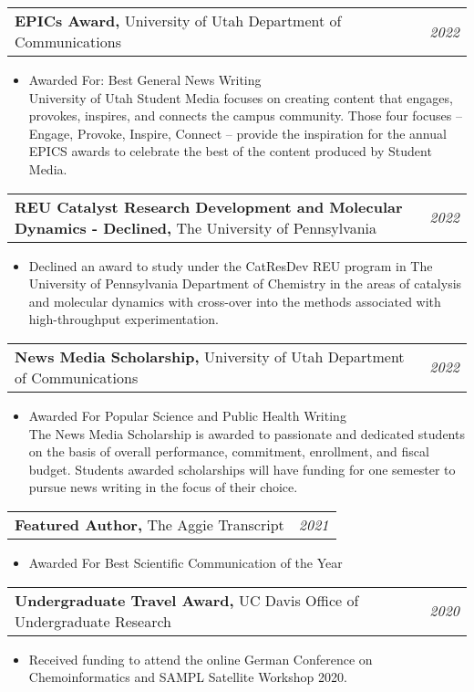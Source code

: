 \documentclass[a4paper,11pt]{article}
\makeatletter
\newcommand{\resumePOR}[3]{
\vspace{0.5mm}\item
    \begin{tabular*}{0.97\textwidth}[t]{l@{\extracolsep{\fill}}r}
        \textbf{#1}\hspace{0.3mm}#2 & \textit{\small{#3}} 
    \end{tabular*}
    \vspace{-2mm}
}
\newcommand{\resumeItemListStart}{\begin{justify}\begin{itemize}[leftmargin=3ex, rightmargin=2ex, noitemsep,labelsep=1.2mm,itemsep=0mm]\small}
\newcommand{\resumeItemListEnd}{\end{itemize}\end{justify}\vspace{-2mm}}
\makeatother
\begin{document}
    \resumePOR{EPICs Award, } %
    {University of Utah Department of Communications } %
    {2022} %
        \resumeItemListStart
    \item {Awarded For: Best General News Writing \cite{homeless} \\
    \setlength\parindent{24pt} University of Utah Student Media focuses on creating content that engages, provokes, inspires, and connects the campus community. Those four focuses – Engage, Provoke, Inspire, Connect – provide the inspiration for the annual EPICS awards to celebrate the best of the content produced by Student Media.}
    \resumeItemListEnd
    
    \resumePOR{REU Catalyst Research Development and Molecular Dynamics - Declined, } %
    {The University of Pennsylvania} %
    {2022} %
        \resumeItemListStart
    \item {Declined an award to study under the CatResDev REU program in The University of Pennsylvania Department of Chemistry in the areas of catalysis and molecular dynamics with cross-over into the methods associated with high-throughput experimentation.}
    \resumeItemListEnd
    
    \resumePOR{News Media Scholarship, } %
    {University of Utah Department of Communications } %
    {2022} %
        \resumeItemListStart
    \item {Awarded For Popular Science and Public Health Writing \\
    \setlength\parindent{24pt} The News Media Scholarship is awarded to passionate and dedicated students on the basis of overall performance, commitment, enrollment, and fiscal budget. Students awarded scholarships will have funding for one semester to pursue news writing in the focus of their choice.}
    \resumeItemListEnd

    \resumePOR{Featured Author, } %
    {The Aggie Transcript} %
    {2021} %
        \resumeItemListStart
    \item {Awarded For Best Scientific Communication of the Year \cite{cryo}}
    \resumeItemListEnd
    
    \resumePOR{Undergraduate Travel Award, } %
    {UC Davis Office of Undergraduate Research} %
    {2020} %
        \resumeItemListStart
    \item {Received funding to attend the online German Conference on Chemoinformatics and SAMPL Satellite Workshop 2020.}
    \resumeItemListEnd
\end{document}
